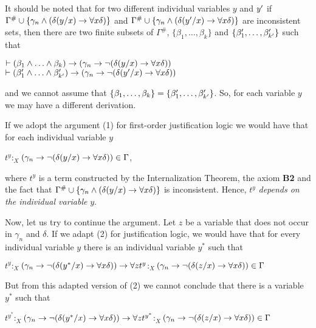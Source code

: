 \qquad It should be noted that for two different individual variables $y$ and $y^{\prime}$ if $\Gamma^{\#} \cup \{ \gamma_{n} \wedge (\delta(y/ x) \rightarrow \forall x \delta) \}$ and $\Gamma^{\#} \cup \{ \gamma_{n} \wedge (\delta(y^{\prime}/ x) \rightarrow \forall x \delta) \}$ are inconsistent sets, then there are two finite subsets of $\Gamma^{\#}$, $\{ \beta_{1}, \dots, \beta_{k} \}$ and $\{ \beta^{\prime}_{1}, \dots, \beta^{\prime}_{k^{\prime}} \}$ such that


\begin{center}
	$\teo (\beta_{1} \e \dots \e \beta_{k}) \impli( \gamma_{n} \impli \nao (\delta(y/ x) \impli \todo x \delta))$\\
	$\teo (\beta\p_{1} \e \dots \e \beta\p_{k\p}) \impli( \gamma_{n} \impli \nao (\delta(y\p/ x) \impli \todo x \delta))$
\end{center}
and we cannot assume that $\{ \beta_{1}, \dots, \beta_{k} \}=\{ \beta^{\prime}_{1}, \dots, \beta^{\prime}_{k^{\prime}} \}$. So, for each variable $y$ we may have a different derivation.

\qquad If we adopt the argument (1) for first-order justification logic we would have that for each individual variable $y$ 

\begin{center}
	$t^{y}$$:_{X}$$( \gamma_{n} \rightarrow \neg (\delta(y/ x) \rightarrow \forall x \delta)) \in \Gamma$,
\end{center}
where $t^{y}$ is a term constructed by the Internalization Theorem, the axiom \textbf{B2} and the fact that $\Gamma^{\#} \cup \{ \gamma_{n} \wedge (\delta(y/ x) \rightarrow \forall x \delta) \}$ is inconsistent. Hence, $t^{y}$ \textit{depends on the individual variable} $y$. 

\qquad Now, let us try to continue the argument. Let $z$ be a variable that does not occur in $\gamma_{n}$ and $\delta$. If we adapt (2) for justification logic, we would have that for every individual variable $y$ there is an individual variable $y^{*}$ such that

\begin{center}
	$t^{y}$$:_{X}$$(\gamma_{n} \rightarrow \neg (\delta(y^{*}/ x) \rightarrow \forall x \delta)) \rightarrow \forall z t^{y}$$:_{X}$$(\gamma_{n} \rightarrow \neg (\delta(z/ x) \rightarrow \forall x \delta)) \in \Gamma$
\end{center}


\qquad But from this adapted version of (2) we cannot conclude that there is a variable $y^{*}$ such that


\begin{center}
	$t^{y^{*}}$$:_{X}$$(\gamma_{n} \rightarrow \neg (\delta(y^{*}/ x) \rightarrow \forall x \delta)) \rightarrow \forall z t^{y^{*}}$$:_{X}$$(\gamma_{n} \rightarrow \neg (\delta(z/ x) \rightarrow \forall x \delta)) \in \Gamma$
\end{center}

